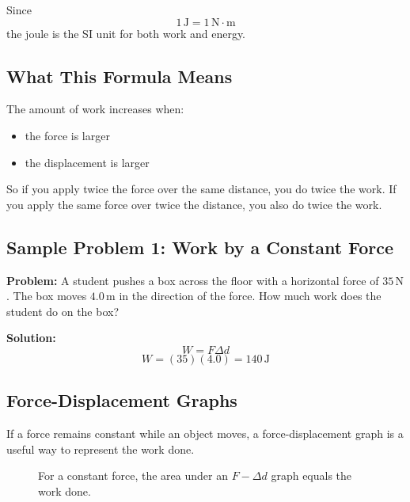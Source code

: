 Since
\begin{equation*}
    1\,\text{J} = 1\,\text{N}\cdot\text{m}
\end{equation*}
the joule is the SI unit for both work and energy.

\subsection{What This Formula Means}
The amount of work increases when:
\begin{itemize}
    \item the force is larger
    \item the displacement is larger
\end{itemize}

So if you apply twice the force over the same distance, you do twice the work. If you apply the same force over twice the distance, you also do twice the work.

\subsection*{Sample Problem 1: Work by a Constant Force}
\textbf{Problem:} A student pushes a box across the floor with a horizontal force of $35\,\text{N}$. The box moves $4.0\,\text{m}$ in the direction of the force. How much work does the student do on the box?

\textbf{Solution:}
\begin{equation*}
    W = F \Delta d
\end{equation*}
\begin{equation*}
    W = (35)(4.0) = 140\,\text{J}
\end{equation*}

\subsection{Force-Displacement Graphs}
If a force remains constant while an object moves, a force-displacement graph is a useful way to represent the work done.

\begin{figure}[h]
    \centering
    \caption{For a constant force, the area under an $F-\Delta d$ graph equals the work done.}
\end{figure}


